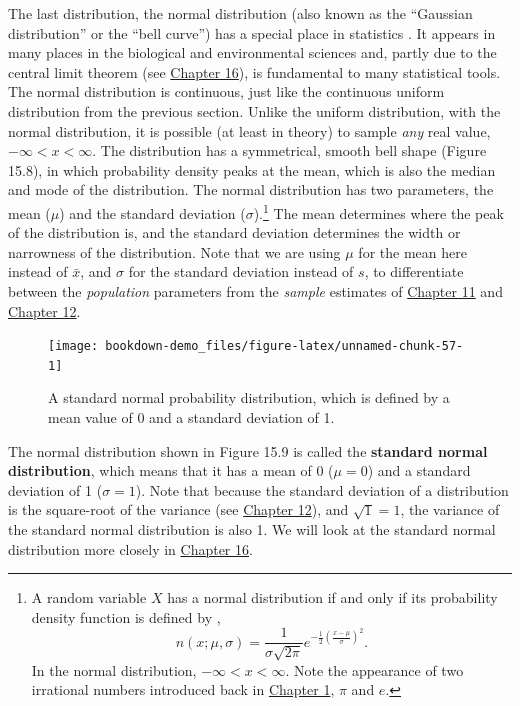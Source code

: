 \documentclass[
  openany]{scrbook}
\begin{document}
The last distribution, the normal distribution (also known as the ``Gaussian distribution'' or the ``bell curve'') has a special place in statistics \citep{Miller2004, Navarro2022}.
It appears in many places in the biological and environmental sciences and, partly due to the central limit theorem (see \protect\hyperlink{Chapter_16}{Chapter 16}), is fundamental to many statistical tools.
The normal distribution is continuous, just like the continuous uniform distribution from the previous section.
Unlike the uniform distribution, with the normal distribution, it is possible (at least in theory) to sample \emph{any} real value, \(-\infty < x < \infty\).
The distribution has a symmetrical, smooth bell shape (Figure 15.8), in which probability density peaks at the mean, which is also the median and mode of the distribution.
The normal distribution has two parameters, the mean (\(\mu\)) and the standard deviation (\(\sigma\)).\footnote{A random variable \(X\) has a normal distribution if and only if its probability density function is defined by \citep{Miller2004}, \[n\left(x; \mu, \sigma\right) = \frac{1}{\sigma\sqrt{2\pi}}e^{-\frac{1}{2}\left(\frac{x - \mu}{\sigma}\right)^{2}}.\] In the normal distribution, \(-\infty < x < \infty\). Note the appearance of two irrational numbers introduced back in \protect\hyperlink{Chapter_1}{Chapter 1}, \(\pi\) and \(e\).}
The mean determines where the peak of the distribution is, and the standard deviation determines the width or narrowness of the distribution.
Note that we are using \(\mu\) for the mean here instead of \(\bar{x}\), and \(\sigma\) for the standard deviation instead of \(s\), to differentiate between the \emph{population} parameters from the \emph{sample} estimates of \protect\hyperlink{Chapter_11}{Chapter 11} and \protect\hyperlink{Chapter_12}{Chapter 12}.

\begin{figure}
\texttt{[image: bookdown-demo\_files/figure-latex/unnamed-chunk-57-1]} \caption{A standard normal probability distribution, which is defined by a mean value of 0 and a standard deviation of 1.}\label{fig:unnamed-chunk-57}
\end{figure}

The normal distribution shown in Figure 15.9 is called the \textbf{standard normal distribution}, which means that it has a mean of 0 (\(\mu = 0\)) and a standard deviation of 1 (\(\sigma = 1\)).
Note that because the standard deviation of a distribution is the square-root of the variance (see \protect\hyperlink{Chapter_12}{Chapter 12}), and \(\sqrt{1} = 1\), the variance of the standard normal distribution is also 1.
We will look at the standard normal distribution more closely in \protect\hyperlink{Chapter_16}{Chapter 16}.
\end{document}
